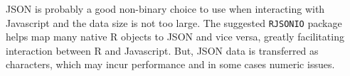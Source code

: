 \documentclass[12pt]{article}
\begin{document}
JSON is probably a good non-binary choice to use when interacting with
Javascript and the data size is not too large. The suggested {\tt RJSONIO}
package helps map many native R objects to JSON and vice versa, greatly
facilitating interaction between R and Javascript. But, JSON data is
transferred as characters, which may incur performance and in some cases
numeric issues.
\end{document}
